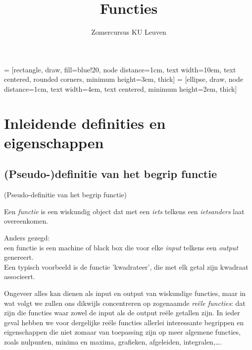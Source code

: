 \documentclass{ximera}
\author{Zomercursus KU Leuven}
\title{Functies}
\begin{document}
 = [rectangle, draw, fill=blue!20, node distance=1cm, text width=10em, text centered, rounded corners, minimum height=3em, thick]
 = [ellipse, draw, node distance=1cm, text width=4em, text centered, minimum height=2em, thick]
    


\section{Inleidende definities en eigenschappen}

\subsection{(Pseudo-)definitie van het begrip functie}

\begin{definition} (Pseudo-definitie van het begrip functie)
    
Een  \textit{functie} is een wiskundig object dat met een \textit{iets} telkens een \textit{ietsanders} laat overeenkomen. 
\end{definition}

Anders gezegd: \\
een functie is een machine of black box die voor elke \textit{input} telkens een \textit{output} genereert.
\\

Een typisch voorbeeld is de functie 'kwadrateer', die met elk getal zijn kwadraat associeert.

Ongeveer alles kan dienen als input en output van wiskundige functies, maar in wat volgt we zullen ons dikwijls concentreren op zogenaamde \textit{reële functies}: dat zijn die functies waar zowel de input als de output reële getallen zijn. In ieder geval hebben we voor dergelijke reële functies allerlei interessante begrippen en eigenschappen die niet zomaar van toepassing zijn op meer algemene functies, zoals nulpunten, minima en maxima, grafieken, afgeleiden, integralen,\ldots.

\begin{center}
\end{center}
\end{document}
